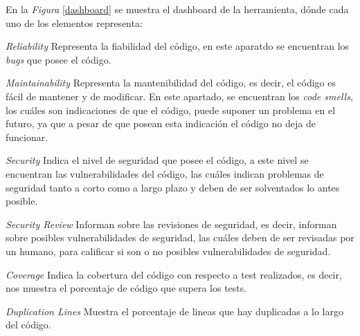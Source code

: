 En la \textit{Figura} \ref{dashboard} se muestra el dashboard de la herramienta, dónde cada uno de los elementos representa:

\begin{list}{\textbullet}{ %
    \addtolength{\itemsep}{-2mm} %
    \setlength{\itemindent}{2mm}}

    \item \textit{Reliability} Representa la fiabilidad del código, en este aparatdo se encuentran los \textit{bugs} que posee el código.
    \item \textit{Maintainability} Representa la mantenibilidad del código, es decir, el código es fácil de mantener y de modificar. En este apartado, se encuentran los \textit{code smells}, los cuáles son indicaciones de que el código, puede suponer un problema en el futuro, ya que a pesar de que posean esta indicación el código no deja de funcionar.
    \item \textit{Security} Indica el nivel de seguridad que posee el código, a este nivel se encuentran las vulnerabilidades del código, las cuáles indican problemas de seguridad tanto a corto como a largo plazo y deben de ser solventados lo antes posible.
    \item \textit{Security Review} Informan sobre las revisiones de seguridad, es decir, informan sobre posibles vulnerabilidades de seguridad, las cuáles deben de ser revisadas por un humano, para calificar si son o no posibles vulnerabilidades de seguridad.
    \item \textit{Coverage} Indica la cobertura del código con respecto a test realizados, es decir, nos muestra el porcentaje de código que supera los tests.
    \item \textit{Duplication Lines} Muestra el porcentaje de lineas que hay duplicadas a lo largo del código.
\end{list}
